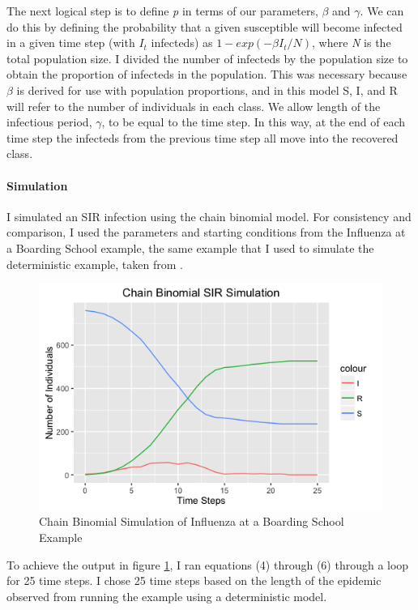 \documentclass{article}
\begin{document}
The next logical step is to define \textit{p} in terms of our parameters, $\beta$ and $\gamma$. We can do this by defining the probability that a given susceptible will become infected in a given time step (with $I_{t}$ infecteds) as $1-exp(-\beta I_{t}/N)$, where \textit{N} is the total population size. I divided the number of infecteds by the population size to obtain the proportion of infecteds in the population. This was necessary because $\beta$ is derived for use with population proportions, and in this model S, I, and R will refer to the number of individuals in each class. We allow length of the infectious period, $\gamma$, to be equal to the time step. In this way, at the end of each time step the infecteds from the previous time step all move into the recovered class. 

\paragraph{Simulation}

I simulated an SIR infection using the chain binomial model. For consistency and comparison, I used the parameters and starting conditions from the Influenza at a Boarding School example, the same example that I used to simulate the deterministic example, taken from \cite{keeling2011modeling}. 

\begin{figure}[htbp]
\includegraphics[scale=.5, center]{ChainBinomSim.png}
\caption{Chain Binomial Simulation of Influenza at a Boarding School Example}
\label{fig:ChainBinomSim}
\end{figure}

To achieve the output in figure \ref{fig:ChainBinomSim}, I ran equations (4) through (6) through a loop for 25 time steps. I chose 25 time steps based on the length of the epidemic observed from running the example using a deterministic model. 
\end{document}
